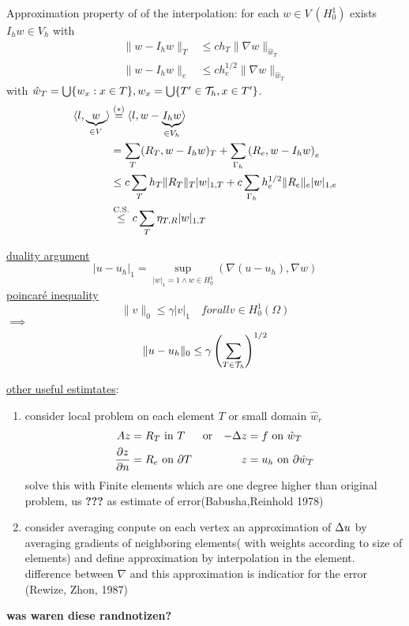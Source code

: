 Approximation property of of the interpolation:\nl
for each $w\in V\ (H^1_0)$ exists $I_hw\in V_h$ with 
\begin{align*}
	\|w-I_hw\|_T &\leq c h_T \|\nabla w\|_{\hat{w}_T}\\
	\|w-I_hw\|_e &\leq c h^{1/2}_e \|\nabla w\|_{\hat{w}_T}
\end{align*}
with $\hat{w}_T = \bigcup\{w_x:x\in T\}, w_x = \bigcup \{T'\in\mathcal{T}_h,x\in T'\}$.
\begin{align*}
	\langle l,\underbrace{w}_{\in V} \rangle &\stackrel{(*)}{=} \langle l,w-\underbrace{I_hw}_{\in V_h} \rangle\\
	&= \sum \limits_T  (R_T,w-I_hw)_T + \sum \limits_{\Gamma_h} \left(R_e,w-I_hw\right)_e\\
	&\leq c\sum \limits_T h_T  \|R_T\|_T |w|_{1,T} + c\sum \limits_{\Gamma_h} h^{1/2}_e \|R_e\|_e |w|_{1,e}\\
	&\stackrel{\text{C.S.}}{\leq} c\sum \limits_T \eta_{T,R} |w|_{1,T}
\end{align*}

\underline{duality argument}
\begin{equation*}
	|u-u_h|_1 = \underset{|w|_1=1 \land w\in H^1_0}{\sup} ( \nabla(u-u_h),\nabla w)
\end{equation*}
\underline{poincaré inequality}
\begin{equation*}
	\|v\|_0 \leq \gamma |v|_1 \quad forall v \in H^1_0(\Omega)
\end{equation*}
$\implies$
\begin{equation*}
	\|u-u_h\|_0 \leq \gamma \left( \sum \limits_{T \in \mathcal{T}_h}\right)^{1/2}
\end{equation*}

\underline{other useful estimtates}:
\begin{enumerate}[label= (\alph*)]
	\item consider local problem on each element $T$ or small domain $\hat{w}_r$ 
	\begin{align*}
		Az &= R_T \text{ in } T  &&\text{or}& -\Delta z&= f \text{ on } \hat{w}_T\\
		\frac{\partial z}{\partial n} &= R_e \text{ on } \partial T  &&& z &= u_h \text{ on } \partial \hat{w}_T
	\end{align*}
	solve this with Finite elements which are one degree higher than original problem, us \textbf{???} as estimate of error(Babusha,Reinhold 1978) 
	\item consider averaging\nl
	conpute on each vertex an approximation of $\Delta u$ by averaging gradients of neighboring elements( with weights according to size of elements) and define approximation by interpolation in the element.\nl
	difference between $\nabla $ and this approximation is indicatior for the error (Rewize, Zhon,  1987)
\end{enumerate}
\textbf{was waren diese randnotizen?}
